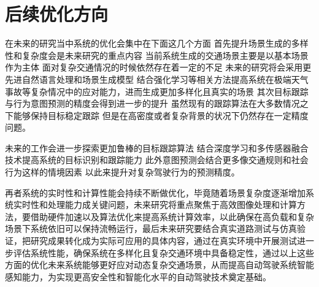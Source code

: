 \section{后续优化方向}

在未来的研究当中系统的优化会集中在下面这几个方面 首先提升场景生成的多样性和复杂度会是未来研究的重点内容 当前系统生成的交通场景主要是以基本场景作为主体 面对复杂交通情况的时候依然存在着一定的不足 未来的研究将会采用更先进自然语言处理和场景生成模型 结合强化学习等相关方法提高系统在极端天气事故等复杂情况中的应对能力，进而生成更加多样化且真实的场景 其次目标跟踪与行为意图预测的精度会得到进一步的提升 虽然现有的跟踪算法在大多数情况之下能够保持目标稳定跟踪 但是在高密度或者复杂背景的状况下仍然存在一定精度问题。

未来的工作会进一步探索更加鲁棒的目标跟踪算法 结合深度学习和多传感器融合技术提高系统的目标识别和跟踪能力 此外意图预测会结合更多像交通规则和社会行为这样的情境因素 以此来提升对复杂驾驶行为的预测精度。


再者系统的实时性和计算性能会持续不断做优化，毕竟随着场景复杂度逐渐增加系统实时性和处理能力成关键问题，未来研究将重点聚焦于高效图像处理和计算方法，要借助硬件加速以及算法优化来提高系统计算效率，以此确保在高负载和复杂场景下系统依旧可以保持流畅运行，最后未来研究要结合真实道路测试与仿真验证，把研究成果转化成为实际可应用的具体内容，通过在真实环境中开展测试进一步评估系统性能，确保系统在多样化且复杂交通环境中具备稳定性，通过以上这些方面的优化未来系统能够更好应对动态复杂交通场景，从而提高自动驾驶系统智能感知能力，为实现更高安全性和智能化水平的自动驾驶技术奠定基础。